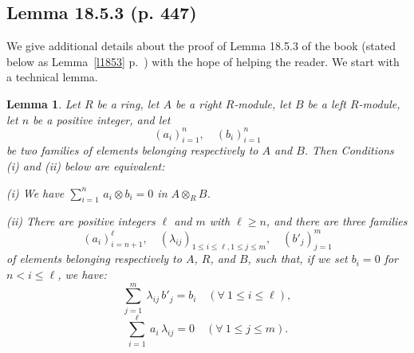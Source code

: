 \documentclass[12pt]{article}
\newtheorem{lem}[thm]{Lemma}
\theoremstyle{remark}
\theoremstyle{definition}
\newcommand{\nn}{\noindent}
\begin{document}

\subsection{Lemma 18.5.3 (p. 447)} 

We give additional details about the proof of Lemma 18.5.3 of the book (stated below as Lemma~\ref{l1853} p.~\pageref{l1853}) with the hope of helping the reader. We start with a technical lemma.

\begin{lem}\label{techlem1}
Let $R$ be a ring, let $A$ be a right $R$-module, let $B$ be a left $R$-module, let $n$ be a positive integer, and let 
$$
(a_i)_{i=1}^n,\quad(b_i)_{i=1}^n
$$
be two families of elements belonging respectively to $A$ and $B$. Then Conditions \emph{(i)} and \emph{(ii)} below are equivalent:

\nn\emph{(i)} We have $\sum_{i=1}^n\,a_i\otimes b_i=0$ in $A\otimes_RB$. 

\nn\emph{(ii)} There are positive integers $\ell$ and $m$ with $\ell\ge n$, and there are three families 
$$
(a_i)_{i=n+1}^\ell,\quad(\lambda_{ij})_{1\le i\le\ell,1\le j\le m},\quad(b'_j)_{j=1}^m
$$ 
of elements belonging respectively to $A$, $R$, and $B$, such that, if we set $b_i=0$ for $n<i\le\ell$, we have:
%
\begin{equation}\label{lij1}
\sum_{j=1}^m\ \lambda_{ij}\,b'_j=b_i\quad(\forall\ 1\le i\le\ell),
\end{equation}
%
\begin{equation}\label{lij2}
\sum_{i=1}^\ell\ a_i\,\lambda_{ij}=0\quad(\forall\ 1\le j\le m).
\end{equation}
\end{lem} 
\end{document}
